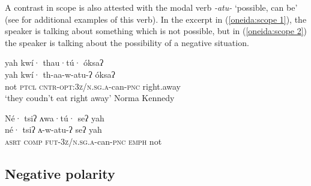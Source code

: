 \documentclass[output=paper,colorlinks,citecolor=brown]{langscibook}
\begin{document}
A contrast in scope is also attested with the modal verb \textit{-atu-} `possible, can be' (see  for additional examples of this verb). In the excerpt in (\ref{oneida:scope 1}), the speaker is talking about something which is not possible, but in (\ref{oneida:scope 2}) the speaker is talking about the possibility of a negative situation.

\ea\label{oneida:scope 1}	
    {\glll yah kwí· thau·tú· \'oksaʔ \\
    yah kwí· th-aa-w-atu-ʔ \'oksaʔ  \\
    not \textsc{ptcl} \textsc{cntr-opt:3z/n.sg.a}-can-\textsc{pnc} {right.away}  \\}
    \glt `they coudn't eat right away' Norma Kennedy \citep[50 (3)]{MichelsonEtAl2016}
\z

\ea\label{oneida:scope 2}
    {\glll Né· tsiʔ ʌwa·tú· seʔ yah \\
    né· tsiʔ ʌ-w-atu-ʔ seʔ yah  \\
     \textsc{asrt} \textsc{comp} \textsc{fut-3z/n.sg.a}-can-\textsc{pnc} \textsc{emph} not  \\ }
\z

\subsection{Negative polarity}
\label{oneida:sec:npi}
\end{document}
